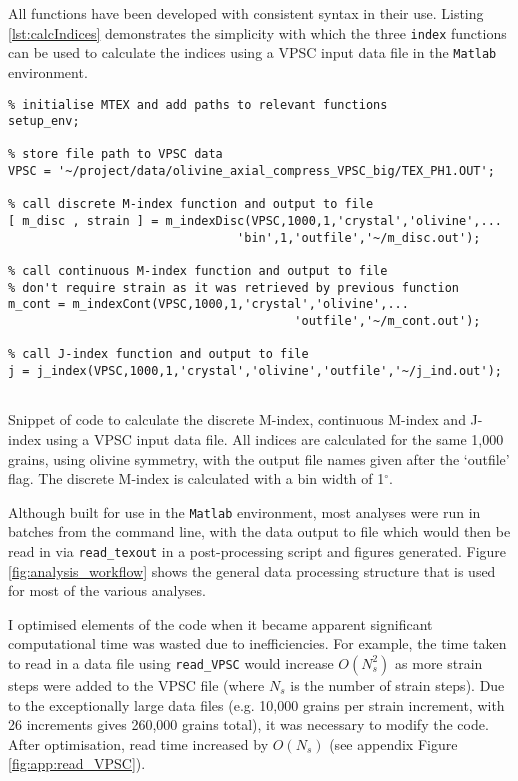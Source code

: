 \documentclass[a4paper,12pt,twoside]{report}
\numberwithin{equation}{chapter}
\begin{document}
All functions have been developed with consistent syntax in their use. Listing \ref{lst:calcIndices} demonstrates the simplicity with which the three \texttt{index} functions can be used to calculate the indices using a VPSC input data file in the \texttt{Matlab} environment.

\begin{program}[htbp] 
   \centering
   \begin{lstlisting}
% initialise MTEX and add paths to relevant functions
setup_env;   
   
% store file path to VPSC data
VPSC = '~/project/data/olivine_axial_compress_VPSC_big/TEX_PH1.OUT';

% call discrete M-index function and output to file
[ m_disc , strain ] = m_indexDisc(VPSC,1000,1,'crystal','olivine',...
                                'bin',1,'outfile','~/m_disc.out');

% call continuous M-index function and output to file
% don't require strain as it was retrieved by previous function
m_cont = m_indexCont(VPSC,1000,1,'crystal','olivine',...
                                        'outfile','~/m_cont.out');

% call J-index function and output to file
j = j_index(VPSC,1000,1,'crystal','olivine','outfile','~/j_ind.out');


 \end{lstlisting}
   \caption{Snippet of code to calculate the discrete M-index, continuous M-index and J-index using a VPSC input data file. All indices are calculated for the same 1,000 grains, using olivine symmetry, with the output file names given after the \lq{}outfile\rq{} flag. The discrete M-index is calculated with a bin width of 1$^\circ$.}
   \label{lst:calcIndices}
\end{program}

Although built for use in the \texttt{Matlab} environment, most analyses were run in batches from the command line, with the data output to file which would then be read in via \texttt{read\_{}texout} in a post-processing script and figures generated. Figure \ref{fig:analysis_workflow} shows the general data processing structure that is used for most of the various analyses.

I optimised elements of the code when it became apparent significant computational time was wasted due to inefficiencies. For example, the time taken to read in a data file using \texttt{read\_{}VPSC} would increase $O(N_s^2)$ as more strain steps were added to the VPSC file (where $N_s$ is the number of strain steps). Due to the exceptionally large data files (e.g. 10,000 grains per strain increment, with 26 increments gives 260,000 grains total), it was necessary to modify the code. After optimisation, read time increased by $O(N_s)$ (see appendix Figure \ref{fig:app:read_VPSC}). 
\end{document}
